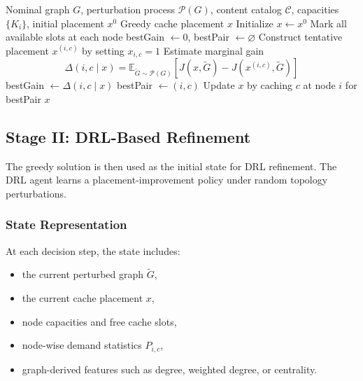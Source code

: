 \begin{algorithm}[t]
\caption{Greedy Topology-Aware Cache Initialization}
\label{alg:greedy}
\begin{algorithmic}[1]
\Require Nominal graph \(G\), perturbation process \(\mathcal{P}(G)\), content catalog \(\mathcal{C}\), capacities \(\{K_i\}\), initial placement \(x^0\)
\Ensure Greedy cache placement \(x\)
\State Initialize \(x \gets x^0\)
\State Mark all available slots at each node
\Repeat
    \State bestGain \(\gets 0\), bestPair \(\gets \varnothing\)
            \State Construct tentative placement \(x^{(i,c)}\) by setting \(x_{i,c}=1\)
            \State Estimate marginal gain
            \[
            \Delta(i,c \mid x)
            =
            \mathbb{E}_{\tilde{G} \sim \mathcal{P}(G)}
            \left[
            J(x,\tilde{G}) - J(x^{(i,c)},\tilde{G})
            \right]
            \]
                \State bestGain \(\gets \Delta(i,c \mid x)\)
                \State bestPair \(\gets (i,c)\)
            \EndIf
        \EndFor
    \EndFor
        \State Update \(x\) by caching \(c\) at node \(i\) for bestPair
    \EndIf
{}
\State \Return \(x\)
\end{algorithmic}
\end{algorithm}

\subsection{Stage II: DRL-Based Refinement}

The greedy solution is then used as the initial state for DRL refinement. The DRL agent learns a placement-improvement policy under random topology perturbations.

\subsubsection{State Representation}
At each decision step, the state includes:
\begin{itemize}
    \item the current perturbed graph \(\tilde{G}\),
    \item the current cache placement \(x\),
    \item node capacities and free cache slots,
    \item node-wise demand statistics \(P_{i,c}\),
    \item graph-derived features such as degree, weighted degree, or centrality.
\end{itemize}


